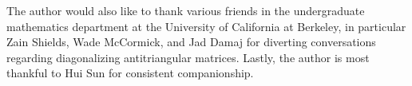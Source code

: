 \documentclass{amsart}
\begin{document}
The author would also like to thank various friends in the undergraduate mathematics department at the University of California at Berkeley, in particular Zain Shields, Wade McCormick, and Jad Damaj for diverting conversations regarding diagonalizing antitriangular matrices. Lastly, the author is most thankful to Hui Sun for consistent companionship.







\printbibliography
\end{document}
